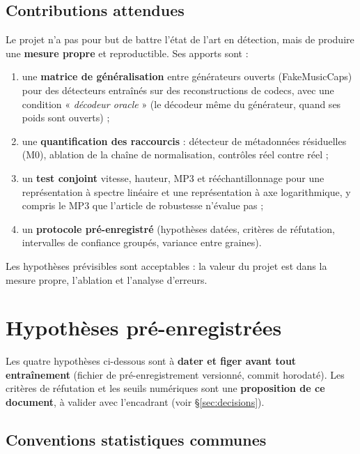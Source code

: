 \documentclass[11pt,a4paper]{article}
\begin{document}
\subsection{Contributions attendues}

Le projet n'a pas pour but de battre l'état de l'art en détection, mais de produire une \textbf{mesure propre} et reproductible. Ses apports sont :
\begin{enumerate}[label=\textbf{C\arabic*.}]
  \item une \textbf{matrice de généralisation} entre générateurs ouverts (FakeMusicCaps) pour des détecteurs entraînés sur des reconstructions de codecs, avec une condition « \emph{décodeur oracle} » (le décodeur même du générateur, quand ses poids sont ouverts) ;
  \item une \textbf{quantification des raccourcis} : détecteur de métadonnées résiduelles (M0), ablation de la chaîne de normalisation, contrôles réel contre réel ;
  \item un \textbf{test conjoint} vitesse, hauteur, MP3 et rééchantillonnage pour une représentation à spectre linéaire et une représentation à axe logarithmique, y compris le MP3 que l'article de robustesse n'évalue pas ;
  \item un \textbf{protocole pré-enregistré} (hypothèses datées, critères de réfutation, intervalles de confiance groupés, variance entre graines).
\end{enumerate}
Les hypothèses prévisibles sont acceptables : la valeur du projet est dans la mesure propre, l'ablation et l'analyse d'erreurs.

\section{Hypothèses pré-enregistrées}
\label{sec:hypotheses}

Les quatre hypothèses ci-dessous sont à \textbf{dater et figer avant tout entraînement} (fichier de pré-enregistrement versionné, commit horodaté). Les critères de réfutation et les seuils numériques sont une \textbf{proposition de ce document}, à valider avec l'encadrant (voir \S\ref{sec:decisions}).

\subsection{Conventions statistiques communes}
\label{sec:conventions}
\end{document}
